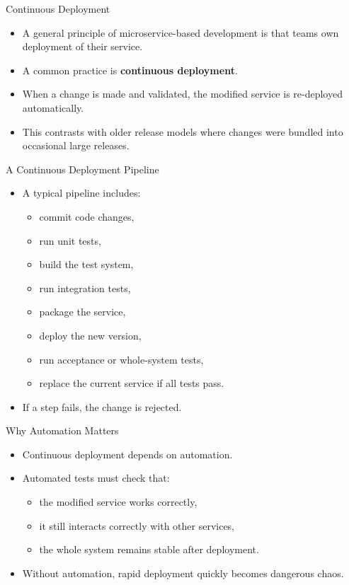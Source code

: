 \begin{frame}{Continuous Deployment}
\begin{itemize}
    \item A general principle of microservice-based development is that teams own deployment of their service.
    \item A common practice is \textbf{continuous deployment}.
    \item When a change is made and validated, the modified service is re-deployed automatically.
    \item This contrasts with older release models where changes were bundled into occasional large releases.
\end{itemize}
\end{frame}

\begin{frame}{A Continuous Deployment Pipeline}
\begin{itemize}
    \item A typical pipeline includes:
    \begin{itemize}
        \item commit code changes,
        \item run unit tests,
        \item build the test system,
        \item run integration tests,
        \item package the service,
        \item deploy the new version,
        \item run acceptance or whole-system tests,
        \item replace the current service if all tests pass.
    \end{itemize}
    \item If a step fails, the change is rejected.
\end{itemize}
\end{frame}

\begin{frame}{Why Automation Matters}
\begin{itemize}
    \item Continuous deployment depends on automation.
    \item Automated tests must check that:
    \begin{itemize}
        \item the modified service works correctly,
        \item it still interacts correctly with other services,
        \item the whole system remains stable after deployment.
    \end{itemize}
    \item Without automation, rapid deployment quickly becomes dangerous chaos.
\end{itemize}
\end{frame}

